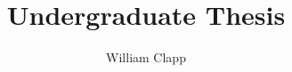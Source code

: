 \documentclass[prl,12pt,letterpaper]{revtex4-2}
\begin{document}
\title{Undergraduate Thesis}
\author{William Clapp}
\maketitle	
\end{document}
